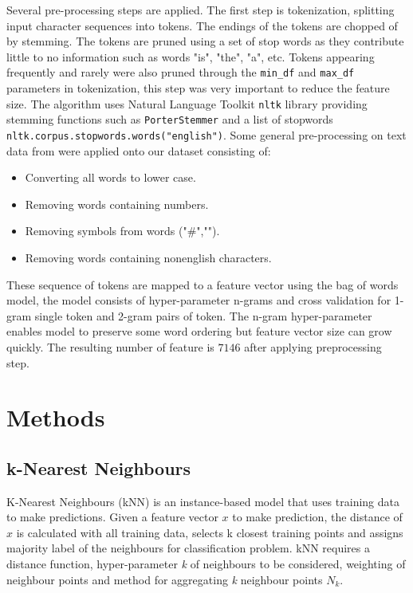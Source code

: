 \documentclass[transmag]{IEEEtran}
\begin{document}
\noindent Several pre-processing steps are applied. The first step is tokenization, splitting input character sequences into tokens. The endings of the tokens are chopped of by stemming. The tokens are pruned using a set of stop words as they contribute little to no information such as words "is", "the", "a", etc. Tokens appearing frequently and rarely were also pruned through the \verb|min_df| and \verb|max_df| parameters in tokenization, this step was very important to reduce the feature size. The algorithm uses Natural Language Toolkit \verb|nltk| library providing stemming functions such as \verb|PorterStemmer| and a list of stopwords \verb|nltk.corpus.stopwords.words("english")|. Some general pre-processing on text data from \cite{sattarov2020forecasting} were applied onto our dataset consisting of:
\begin{itemize}
  \item Converting all words to lower case.
  \item Removing words containing numbers.
  \item Removing symbols from words ("\#","\@@").
  \item Removing words containing non\-english characters.
\end{itemize}

\noindent These sequence of tokens are mapped to a feature vector using the bag of words model, the model consists of hyper-parameter n-grams and cross validation for 1-gram single token and 2-gram pairs of token. The n-gram hyper-parameter enables model to preserve some word ordering but feature vector size can grow quickly. The resulting number of feature is $7146$ after applying preprocessing step.

\section{Methods}
\label{methods}

\subsection{k-Nearest Neighbours}
\noindent K-Nearest Neighbours (kNN) is an instance-based model that uses training data to make predictions. Given a feature vector $x$ to make prediction, the distance of $x$ is calculated with all training data, selects k closest training points and assigns majority label of the neighbours for classification problem. kNN requires a distance function, hyper-parameter \emph{k} of neighbours to be considered, weighting of neighbour points and method for aggregating \emph{k} neighbour points $N_k$. 
\end{document}
